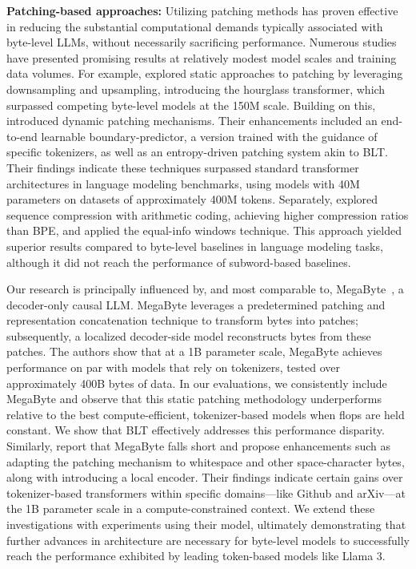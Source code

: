 \textbf{Patching-based approaches:} Utilizing patching methods has proven effective in reducing the substantial computational demands typically associated with byte-level LLMs, without necessarily sacrificing performance. Numerous studies have presented promising results at relatively modest model scales and training data volumes. For example, \cite{nawrot-etal-2022-hierarchical} explored static approaches to patching by leveraging downsampling and upsampling, introducing the hourglass transformer, which surpassed competing byte-level models at the 150M scale. Building on this, \cite{nawrot-etal-2023-efficient} introduced dynamic patching mechanisms. Their enhancements included an end-to-end learnable boundary-predictor, a version trained with the guidance of specific tokenizers, as well as an entropy-driven patching system akin to {\textsc BLT}. Their findings indicate these techniques surpassed standard transformer architectures in language modeling benchmarks, using models with 40M parameters on datasets of approximately 400M tokens. Separately, \cite{lester2024training} explored sequence compression with arithmetic coding, achieving higher compression ratios than BPE, and applied the equal-info windows technique. This approach yielded superior results compared to byte-level baselines in language modeling tasks, although it did not reach the performance of subword-based baselines.

Our research is principally influenced by, and most comparable to, MegaByte~\citep{yu2023megabyte}, a decoder-only causal LLM. MegaByte leverages a predetermined patching and representation concatenation technique to transform bytes into patches; subsequently, a localized decoder-side model reconstructs bytes from these patches. The authors show that at a 1B parameter scale, MegaByte achieves performance on par with models that rely on tokenizers, tested over approximately 400B bytes of data. In our evaluations, we consistently include MegaByte and observe that this static patching methodology underperforms relative to the best compute-efficient, tokenizer-based models when flops are held constant. We show that {\textsc BLT} effectively addresses this performance disparity. Similarly, \cite{slagle2024spacebyte} report that MegaByte falls short and propose enhancements such as adapting the patching mechanism to whitespace and other space-character bytes, along with introducing a local encoder. Their findings indicate certain gains over tokenizer-based transformers within specific domains—like Github and arXiv—at the 1B parameter scale in a compute-constrained context. We extend these investigations with experiments using their model, ultimately demonstrating that further advances in architecture are necessary for byte-level models to successfully reach the performance exhibited by leading token-based models like Llama 3.

